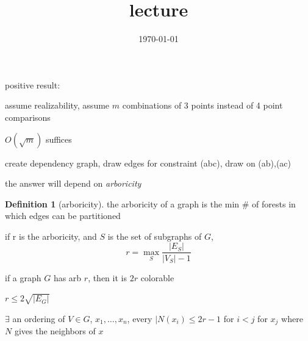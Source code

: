 \documentclass{article}
\title{lecture}
\date{\today}
\theoremstyle{definition}
\newtheorem{definition}{Definition}
\begin{document}
\maketitle
positive result:

assume realizability, assume \(m\) combinations of 3 points instead of 4 point comparisons

\(O(\sqrt{m} )\) suffices

create dependency graph, draw edges for constraint (abc), draw on (ab),(ac)

the answer will depend on \emph{arboricity}

\begin{definition}[arboricity]
    the arboricity of a graph is the min \# of forests in which edges can be partitioned
\end{definition}

if r is the arboricity, and \(S\) is the set of subgraphs of \(G\),
\begin{equation}
    r = \max_S{\frac{|E_S|}{|V_S|-1}}
\end{equation}

if a graph \(G\) has arb \(r\), then it is \(2r\) colorable

\(r\leq 2\sqrt{|E_G|}\)


\(\exists\) an ordering of \(V\in G\), \(x_1,\dots,x_n\), every \(|N(x_i)\leq 2r-1\) for \(i<j\) for \(x_j\) where \(N\) gives the neighbors of \(x\)
\end{document}
